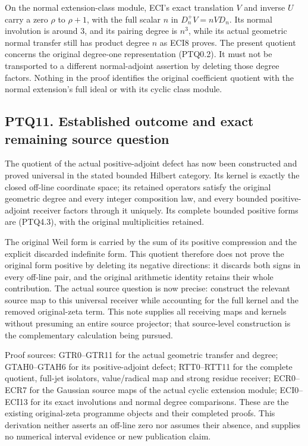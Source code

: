 On the normal extension-class module, ECI's exact translation \(V\) and
inverse \(U\) carry a zero \(\rho\) to \(\rho+1\), with the full scalar
\(n\) in \(D_n^+V=nVD_n\). Its normal involution is around \(3\), and
its pairing degree is \(n^3\), while its actual geometric normal
transfer still has product degree \(n\) as ECI8 proves. The present
quotient concerns the original degree-one representation (PTQ0.2). It
must not be transported to a different normal-adjoint assertion by
deleting those degree factors. Nothing in the proof identifies the
original coefficient quotient with the normal extension's full ideal or
with its cyclic class module.

\subsection{PTQ11. Established outcome and exact remaining source
question}\label{ptq11.-established-outcome-and-exact-remaining-source-question}

The quotient of the actual positive-adjoint defect has now been
constructed and proved universal in the stated bounded Hilbert category.
Its kernel is exactly the closed off-line coordinate space; its retained
operators satisfy the original geometric degree and every integer
composition law, and every bounded positive-adjoint receiver factors
through it uniquely. Its complete bounded positive forms are (PTQ4.3),
with the original multiplicities retained.

The original Weil form is carried by the sum of its positive compression
and the explicit discarded indefinite form. This quotient therefore does
not prove the original form positive by deleting its negative
directions: it discards both signs in every off-line pair, and the
original arithmetic identity retains their whole contribution. The
actual source question is now precise: construct the relevant source map
to this universal receiver while accounting for the full kernel and the
removed original-zeta term. This note supplies all receiving maps and
kernels without presuming an entire source projector; that source-level
construction is the complementary calculation being pursued.

Proof sources: GTR0--GTR11 for the actual geometric transfer and degree;
GTAH0--GTAH6 for its positive-adjoint defect; RTT0--RTT11 for the
complete quotient, full-jet isolators, value/radical map and strong
residue receiver; ECR0--ECR7 for the Gaussian source maps of the actual
cyclic extension module; ECI0--ECI13 for its exact involutions and
normal degree comparisons. These are the existing original-zeta
programme objects and their completed proofs. This derivation neither
asserts an off-line zero nor assumes their absence, and supplies no
numerical interval evidence or new publication claim.
